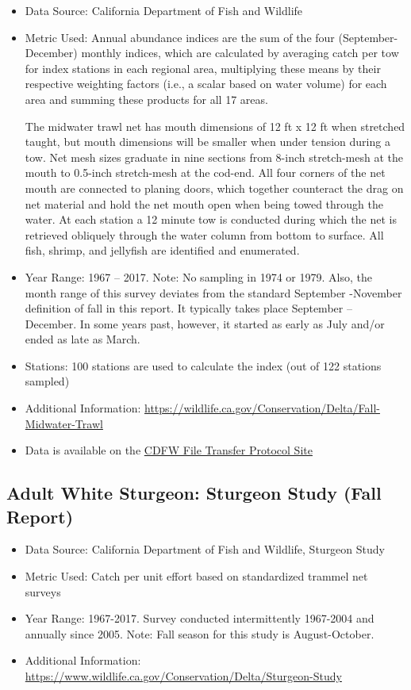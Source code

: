 \documentclass[
]{book}
\providecommand{\tightlist}{%
  \setlength{\itemsep}{0pt}\setlength{\parskip}{0pt}}
\begin{document}
\begin{itemize}
\item
  Data Source: California Department of Fish and Wildlife
\item
  Metric Used: Annual abundance indices are the sum of the four (September-December) monthly indices, which are calculated by averaging catch per tow for index stations in each regional area, multiplying these means by their respective weighting factors (i.e., a scalar based on water volume) for each area and summing these products for all 17 areas.

  The midwater trawl net has mouth dimensions of 12 ft x 12 ft when stretched taught, but mouth dimensions will be smaller when under tension during a tow. Net mesh sizes graduate in nine sections from 8-inch stretch-mesh at the mouth to 0.5-inch stretch-mesh at the cod-end. All four corners of the net mouth are connected to planing doors, which together counteract the drag on net material and hold the net mouth open when being towed through the water. At each station a 12 minute tow is conducted during which the net is retrieved obliquely through the water column from bottom to surface. All fish, shrimp, and jellyfish are identified and enumerated.
\item
  Year Range: 1967 -- 2017. Note: No sampling in 1974 or 1979. Also, the month range of this survey deviates from the standard September -November definition of fall in this report. It typically takes place September -- December. In some years past, however, it started as early as July and/or ended as late as March.
\item
  Stations: 100 stations are used to calculate the index (out of 122 stations sampled)
\item
  Additional Information: \url{https://wildlife.ca.gov/Conservation/Delta/Fall-Midwater-Trawl}
\item
  Data is available on the \href{ftp://ftp.wildlife.ca.gov/TownetFallMidwaterTrawl/FMWT\%20Data/}{CDFW File Transfer Protocol Site}
\end{itemize}

\hypertarget{adult-white-sturgeon-sturgeon-study-fall-report}{%
\subsection{Adult White Sturgeon: Sturgeon Study (Fall Report)}\label{adult-white-sturgeon-sturgeon-study-fall-report}}

\begin{itemize}
\tightlist
\item
  Data Source: California Department of Fish and Wildlife, Sturgeon Study\\
\item
  Metric Used: Catch per unit effort based on standardized trammel net surveys
\item
  Year Range: 1967-2017. Survey conducted intermittently 1967-2004 and annually since 2005. Note: Fall season for this study is August-October.
\item
  Additional Information: \url{https://www.wildlife.ca.gov/Conservation/Delta/Sturgeon-Study}
\end{itemize}
\end{document}
